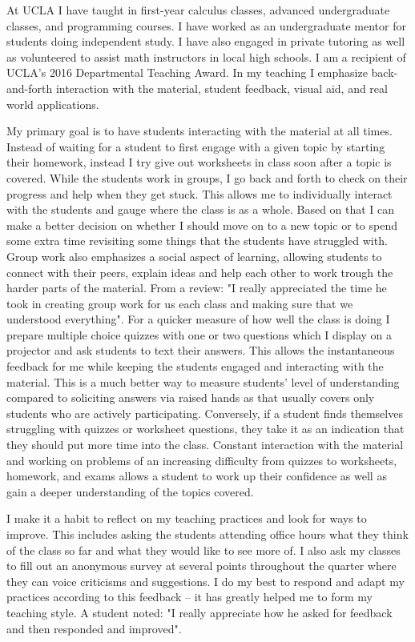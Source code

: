 \documentclass[11pt]{article}
\begin{document}
At UCLA I have taught in first-year calculus classes, advanced undergraduate classes, and programming courses.
I have worked as an undergraduate mentor for students doing independent study.
I have also engaged in private tutoring as well as volunteered to assist math instructors in local high schools.
I am a recipient of UCLA's 2016 Departmental Teaching Award.
In my teaching I emphasize back-and-forth interaction with the material, student feedback, visual aid, and real world applications.

My primary goal is to have students interacting with the material at all times.
Instead of waiting for a student to first engage with a given topic by starting their homework,
instead I try give out worksheets in class soon after a topic is covered.
While the students work in groups, I go back and forth to check on their progress and help when they get stuck.
This allows me to individually interact with the students and gauge where the class is as a whole.
Based on that I can make a better decision on whether I should move on to a new topic or to spend some extra time revisiting some things that the students have struggled with.
Group work also emphasizes a social aspect of learning, allowing students to connect with their peers,
explain ideas and help each other to work trough the harder parts of the material.
From a review: "I really appreciated the time he took in creating group work for us each class and making sure that we understood everything".
For a quicker measure of how well the class is doing I prepare multiple choice quizzes with one or two questions
which I display on a projector and ask students to text their answers.
This allows the instantaneous feedback for me while keeping the students engaged and interacting with the material.
This is a much better way to measure students' level of understanding compared to soliciting answers via raised hands as that usually covers only students who are actively participating.
Conversely, if a student finds themselves struggling with quizzes or worksheet questions, they take it as an indication that they should put more time into the class.
Constant interaction with the material and working on problems of an increasing difficulty from quizzes to worksheets, homework, and exams allows
a student to work up their confidence as well as gain a deeper understanding of the topics covered.

I make it a habit to reflect on my teaching practices and look for ways to improve.
This includes asking the students attending office hours what they think of the class so far and what they would like to see more of.
I also ask my classes to fill out an anonymous survey at several points throughout the quarter where they can voice criticisms and suggestions.
I do my best to respond and adapt my practices according to this feedback -- it has greatly helped me to form my teaching style.
A student noted: "I really appreciate how he asked for feedback and then responded and improved".
\end{document}

